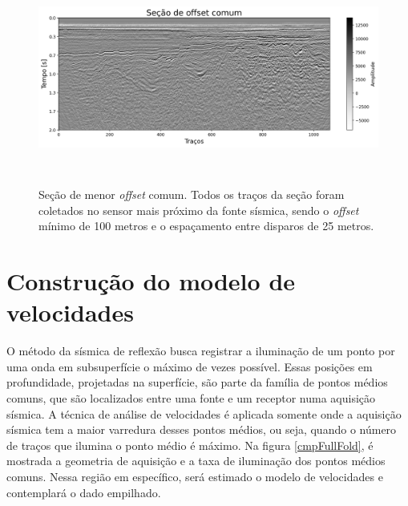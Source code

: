 \documentclass[
	12pt,				%
	openright,			%
	oneside,			%
	a4paper,			%
	english,			%
	brazil				%
	]{abntex2}
\begin{document}
    \begin{figure}[htp!]
		\centering
		\includegraphics[width=15.5cm,height=7cm]{../imagens/nearOffset.png}
		\caption{Seção de menor \textit{offset} comum. Todos os traços da seção foram coletados no sensor mais próximo da fonte sísmica, sendo o \textit{offset} mínimo de 100 metros e o espaçamento entre disparos de 25 metros.}
		\label{nearOffset}
	\end{figure}

\section{Construção do modelo de velocidades}

	O método da sísmica de reflexão busca registrar a iluminação de um ponto por uma onda em subsuperfície o máximo de vezes possível. Essas posições em profundidade, projetadas na superfície, são parte da família de pontos médios comuns, que são localizados entre uma fonte e um receptor numa aquisição sísmica. A técnica de análise de velocidades é aplicada somente onde a aquisição sísmica tem a maior varredura desses pontos médios, ou seja, quando o número de traços que ilumina o ponto médio é máximo. Na figura \ref{cmpFullFold}, é mostrada a geometria de aquisição e a taxa de iluminação dos pontos médios comuns. Nessa região em específico, será estimado o modelo de velocidades e contemplará o dado empilhado.     				
\end{document}
